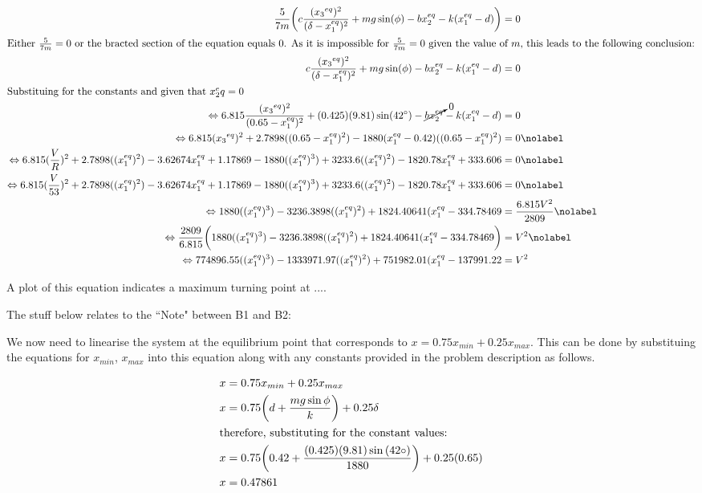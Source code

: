 \documentclass[a4paper,10pt,reqno]{amsart}
\numberwithin{equation}{section}
\begin{document}
\begin{align}
\frac{5}{7m}\bigg(c \frac{({x_3}^{eq})^2}{(\delta - x_1^{eq})^2} + mg\sin(\phi) - bx_2^{eq} - k(x_1^{eq}-d)\bigg) &= 0 \nonumber \\
\intertext{Either $\frac{5}{7m} = 0$ or the bracted section of the equation equals 0. As it is impossible for $\frac{5}{7m} = 0$ given the value of $m$, this leads to the following conclusion:}
c \frac{({x_3}^{eq})^2}{(\delta - x_1^{eq})^2} + mg\sin(\phi) - bx_2^{eq} - k(x_1^{eq}-d) &= 0 \nonumber \\
\intertext{Substituing for the constants and given that $x_2^eq = 0$}
\Leftrightarrow 6.815 \frac{({x_3}^{eq})^2}{(0.65 - x_1^{eq})^2} + (0.425)(9.81)\sin(42^\circ) - \cancelto{0}{bx_2^{eq}} - k(x_1^{eq}-d) &= 0 \nonumber \\
\Leftrightarrow 6.815 ({x_3}^{eq})^2 + 2.7898((0.65 - x_1^{eq})^2) - 1880(x_1^{eq}-0.42)((0.65 - x_1^{eq})^2) &= 0 \nolabel \\
\Leftrightarrow 6.815 (\frac{V}{R})^2 + 2.7898((x_1^{eq})^2) - 3.62674x_1^{eq} + 1.17869 - 1880((x_1^{eq})^3) + 3233.6((x_1^{eq})^2) - 1820.78x_1^{eq} + 333.606 &= 0 \nolabel \\
\Leftrightarrow 6.815 (\frac{V}{53})^2 + 2.7898((x_1^{eq})^2) - 3.62674x_1^{eq} + 1.17869 - 1880((x_1^{eq})^3) + 3233.6((x_1^{eq})^2) - 1820.78x_1^{eq} + 333.606 &= 0 \nolabel \\
\Leftrightarrow 1880((x_1^{eq})^3) - 3236.3898((x_1^{eq})^2) + 1824.40641(x_1^{eq} - 334.78469 &= \frac{6.815V^2}{2809} \nolabel \\
\Leftrightarrow \frac{2809}{6.815}\bigg(1880((x_1^{eq})^3) - 3236.3898((x_1^{eq})^2) + 1824.40641(x_1^{eq} - 334.78469 \bigg) &= V^2 \nolabel \\ 
\Leftrightarrow 774896.55((x_1^{eq})^3) - 1333971.97((x_1^{eq})^2) + 751982.01(x_1^{eq} - 137991.22 &= V^2 \label{eqn: B1deriv}
\end{align}

A plot of this equation indicates a maximum turning point at ....



The stuff below relates to the ``Note" between B1 and B2:

We now need to linearise the system at the equilibrium point that corresponds to $x=0.75x_{min}+0.25x_{max}$.
This can be done by substituing the equations for $x_{min}$, $x_{max}$ into this equation along with any constants provided in the problem description as follows.

\begin{align}
x &= 0.75x_{min} + 0.25 x_{max}\nonumber \\
x &= 0.75 \bigg(d + \frac{mg \sin{\phi}}{k}\bigg) + 0.25 \delta \nonumber \\
\intertext{therefore, substituting for the constant values:}
x &= 0.75 \bigg(0.42 + \frac{(0.425)(9.81) \sin{(42 \circ)}}{1880}\bigg) + 0.25(0.65) \nonumber \\
x &= 0.47861 \label{eqn: xvalue}
\end{align}
\end{document}
